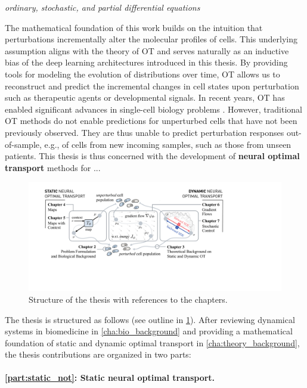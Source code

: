 \emph{ordinary, stochastic, and partial differential equations}

The mathematical foundation of this work builds on the intuition that perturbations incrementally alter the molecular profiles of cells. This underlying assumption aligns with the theory of \acrfull{OT} and serves naturally as an inductive bias of the deep learning architectures introduced in this thesis.
By providing tools for modeling the evolution of distributions over time, OT allows us to reconstruct and predict the incremental changes in cell states upon perturbation such as therapeutic agents or developmental signals. 
In recent years, OT has enabled significant advances in single-cell biology problems \citep{schiebinger2019optimal, lavenant2021towards, demetci2022scot}. However, traditional OT methods do not enable predictions for unperturbed cells that have not been previously observed.
They are thus unable to predict perturbation responses out-of-sample, e.g., of cells from new incoming samples, such as those from unseen patients. 
This thesis is thus concerned with the development of \textbf{neural optimal transport} methods for ...

\begin{figure}[t]
  \includegraphics[width=\textwidth]{figures/fig_overview_thesis.pdf}
  \caption{Structure of the thesis with references to the chapters.}
  \label{fig:overview_thesis}
\end{figure}

The thesis is structured as follows (see outline in \cref{fig:overview_thesis}).
After reviewing dynamical systems in biomedicine in \cref{cha:bio_background} and providing a mathematical foundation of static and dynamic optimal transport in \cref{cha:theory_background}, the thesis contributions are organized in two parts:

\paragraph{\cref{part:static_not}: Static neural optimal transport.}


